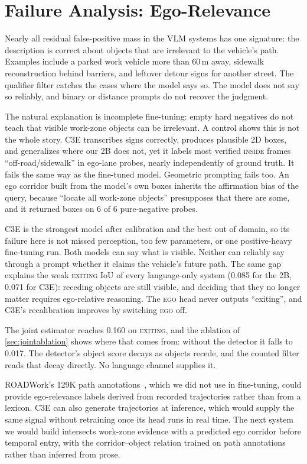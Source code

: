 \documentclass[journal]{IEEEtran}
\newcommand{\st}[1]{\textsc{#1}}
\begin{document}
\section{Failure Analysis: Ego-Relevance}
\label{sec:analysis}

Nearly all residual false-positive mass in the VLM systems has one signature: the description is correct about objects that are irrelevant to the vehicle's path.  Examples include a parked work vehicle more than 60\,m away, sidewalk reconstruction behind barriers, and leftover detour signs for another street. The qualifier filter catches the cases where the model says so.  The model does not say so reliably, and binary or distance prompts do not recover the judgment.

The natural explanation is incomplete fine-tuning: empty hard negatives do not teach that visible work-zone objects can be irrelevant.  A control shows this is not the whole story.  C3E transcribes signs correctly, produces plausible 2D boxes, and generalizes where our 2B does not, yet it labels most verified \st{inside} frames ``off-road/sidewalk'' in ego-lane probes, nearly independently of ground truth.  It fails the same way as the fine-tuned model. Geometric prompting fails too.  An ego corridor built from the model's own boxes inherits the affirmation bias of the query, because ``locate all work-zone objects'' presupposes that there are some, and it returned boxes on 6 of 6 pure-negative probes.

C3E is the strongest model after calibration and the best out of domain, so its failure here is not missed perception, too few parameters, or one positive-heavy fine-tuning run.  Both models can say what is visible.  Neither can reliably say through a prompt whether it claims the vehicle's future path.  The same gap explains the weak \st{exiting} IoU of every language-only system (0.085 for the 2B, 0.071 for C3E): receding objects are still visible, and deciding that they no longer matter requires ego-relative reasoning.  The \st{ego} head never outputs ``exiting'', and C3E's recalibration improves by switching \st{ego} off.

The joint estimator reaches 0.160 on \st{exiting}, and the ablation of \cref{sec:jointablation} shows where that comes from: without the detector it falls to 0.017.  The detector's object score decays as objects recede, and the counted filter reads that decay directly.  No language channel supplies it.

ROADWork's 129K path annotations~\cite{ghosh2025roadwork}, which we did not use in fine-tuning, could provide ego-relevance labels derived from recorded trajectories rather than from a lexicon.  C3E can also generate trajectories at inference, which would supply the same signal without retraining once its head runs in real time.  The next system we would build intersects work-zone evidence with a predicted ego corridor before temporal entry, with the corridor--object relation trained on path annotations rather than inferred from prose.
\end{document}
